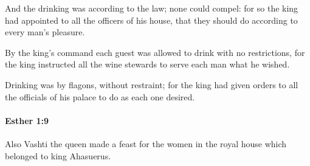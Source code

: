 			\begin{versebox}
					\item[BHS] 
					\item[LXX] 
					\item[ASV] And the drinking was according to the law; none could compel: for so the king had appointed to all the officers of his house, that they should do according to every man's pleasure.
					\item[NIV] By the king’s command each guest was allowed to drink with no restrictions, for the king instructed all the wine stewards to serve each man what he wished.
					\item[NRSV] Drinking was by flagons, without restraint; for the king had given orders to all the officials of his palace to do as each one desired.
			\end{versebox}

		\paragraph{Esther 1:9} %
			\label{ESTHER-1-9}

			Also Vashti the queen made a feast for the women in the royal house which belonged to king Ahasuerus.

